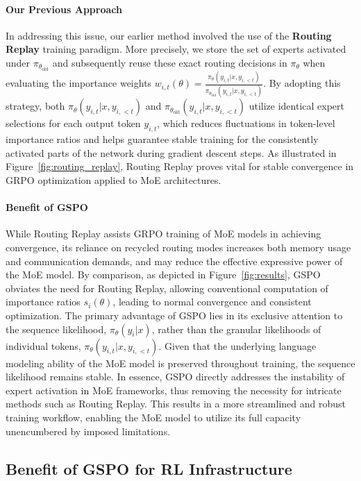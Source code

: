 \paragraph{Our Previous Approach} In addressing this issue, our earlier method involved the use of the \textbf{Routing Replay} training paradigm. More precisely, we store the set of experts activated under $\pi_{\theta_\text{old}}$ and subsequently reuse these exact routing decisions in $\pi_{\theta}$ when evaluating the importance weights $w_{i,t}(\theta) = \frac{ \pi_{\theta} (y_{i,t} | x, y_{i,<t}) }{ \pi_{\theta_\text{old}} (y_{i,t} | x,y_{i,<t})}$. By adopting this strategy, both $\pi_{\theta} (y_{i,t} | x, y_{i,<t})$ and $\pi_{\theta_\text{old}} (y_{i,t} | x, y_{i,<t})$ utilize identical expert selections for each output token $y_{i,t}$, which reduces fluctuations in token-level importance ratios and helps guarantee stable training for the consistently activated parts of the network during gradient descent steps. As illustrated in Figure~\ref{fig:routing_replay}, Routing Replay proves vital for stable convergence in GRPO optimization applied to MoE architectures.

\paragraph{Benefit of GSPO} While Routing Replay assists GRPO training of MoE models in achieving convergence, its reliance on recycled routing modes increases both memory usage and communication demands, and may reduce the effective expressive power of the MoE model. By comparison, as depicted in Figure~\ref{fig:results}, GSPO obviates the need for Routing Replay, allowing conventional computation of importance ratios $s_i(\theta)$, leading to normal convergence and consistent optimization. The primary advantage of GSPO lies in its exclusive attention to the sequence likelihood, $\pi_{\theta} (y_i | x)$, rather than the granular likelihoods of individual tokens, $\pi_{\theta} (y_{i,t} | x, y_{i,<t})$. Given that the underlying language modeling ability of the MoE model is preserved throughout training, the sequence likelihood remains stable. In essence, GSPO directly addresses the instability of expert activation in MoE frameworks, thus removing the necessity for intricate methods such as Routing Replay. This results in a more streamlined and robust training workflow, enabling the MoE model to utilize its full capacity unencumbered by imposed limitations.

\subsection{Benefit of GSPO for RL Infrastructure}


